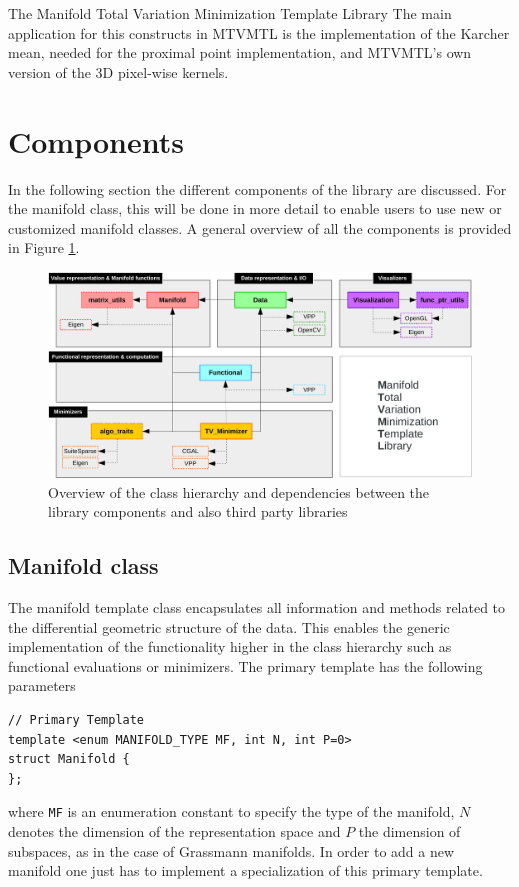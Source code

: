 \begin{chapter}{The Manifold Total Variation Minimization Template Library}
The main application for this constructs in MTVMTL is the implementation of the Karcher mean, needed for the proximal point implementation, and MTVMTL's own version
of the 3D pixel-wise kernels.


\section{Components} %
\label{sec:Components}
In the following section the different components of the library are discussed. For the manifold class, this will be done in more detail to enable users to use new or customized manifold classes. A general overview of all the components is provided in Figure \ref{fig:components}.
\begin{figure}[h!]
        \centering
	    \includegraphics[width=1.0\linewidth]{./figures/library/components.pdf}
	\caption[Overview of library components]{Overview of the class hierarchy and dependencies between the library components and also third party libraries
	}
	\label{fig:components}
\end{figure}

\subsection{Manifold class} %
\label{sub:Manifold classes}
The manifold template class encapsulates all information and methods related to the differential geometric structure of the data. 
This enables the generic implementation of the functionality higher in the class hierarchy such as functional evaluations or minimizers.
The primary template has the following parameters
\cppinline
\begin{lstlisting}
// Primary Template
template <enum MANIFOLD_TYPE MF, int N, int P=0>
struct Manifold {
}; 
\end{lstlisting}
where \texttt{MF} is an enumeration constant to specify the type of the manifold, $N$ denotes the dimension of the representation space and $P$ the dimension of subspaces,
as in the case of Grassmann manifolds. In order to add a new manifold one just has to implement a specialization of this primary template.\\


\end{chapter}
